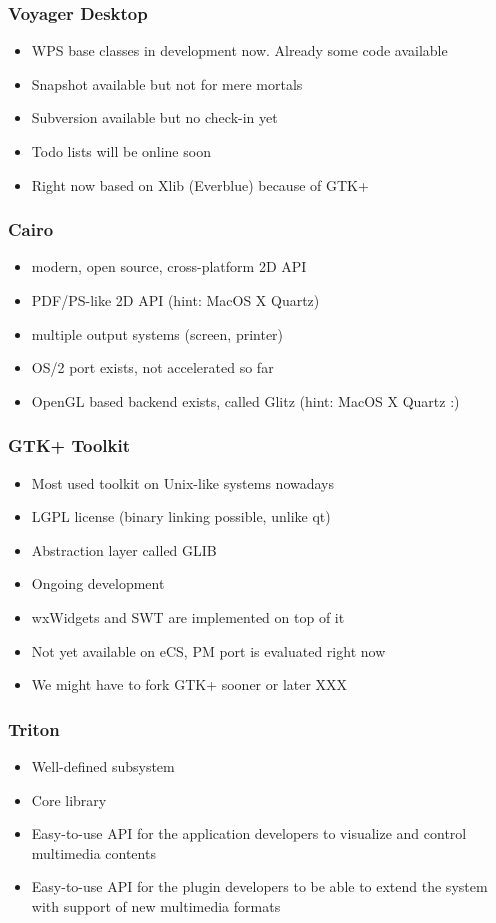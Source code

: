 \documentclass{beamer}
\begin{document}
\begin{frame}
\frametitle{Voyager Desktop}
\begin{itemize}[<+->]
  \item WPS base classes in development now. Already some code available
  \item Snapshot available but not for mere mortals
  \item Subversion available but no check-in yet
  \item Todo lists will be online soon
  \item Right now based on Xlib (Everblue) because of GTK+
\end{itemize}
\end{frame}

\begin{frame}
\frametitle{Cairo}
\begin{itemize}[<+->]
  \item modern, open source, cross-platform 2D API
  \item PDF/PS-like 2D API (hint: MacOS X Quartz)
  \item multiple output systems (screen, printer)
  \item OS/2 port exists, not accelerated so far
  \item OpenGL based backend exists, called Glitz (hint: MacOS X Quartz :)
\end{itemize}
\end{frame}

\begin{frame}
\frametitle{GTK+ Toolkit}
\begin{itemize}[<+->]
  \item Most used toolkit on Unix-like systems nowadays
  \item LGPL license (binary linking possible, unlike qt)
  \item Abstraction layer called GLIB
  \item Ongoing development
  \item wxWidgets and SWT are implemented on top of it
  \item Not yet available on eCS, PM port is evaluated right now
  \item We might have to fork GTK+ sooner or later XXX
\end{itemize}
\end{frame}

\begin{frame}
\frametitle{Triton}
\begin{itemize}[<+->]
	\item Well-defined subsystem
	\item Core library
	\item Easy-to-use API for the application developers to visualize and control multimedia contents
	\item Easy-to-use API for the plugin developers to be able to extend the system with support of new multimedia formats
\end{itemize}
\end{frame}
\end{document}

